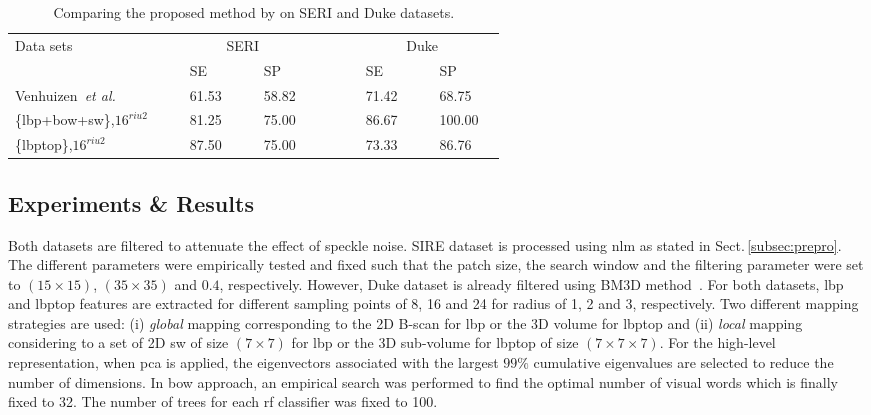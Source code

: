 \begin{tiny}
\begin{table*}[t]
\caption{Comparing the proposed method by \cite{Venhuizen2015} on SERI and Duke datasets.}%
\centering
\begin{tabular}{lcclcclcccclcclc}
\toprule
Data sets 	& & &\multicolumn{4}{c}{SERI}& & & & &\multicolumn{4}{c}{Duke} & \\
  \cmidrule(l){2-8}  \cmidrule(l){10-16}
	         & & & SE & & & SP & & & & & SE & & & SP & \\
\midrule
Venhuizen~\textit{et al.} \cite{Venhuizen2015} 		& & & 61.53 & & & 58.82 & & & & & 71.42 & & & 68.75 & \\
\{\ac{lbp}+\ac{bow}+\ac{sw}\},$16^{riu2}$ 	& & & 81.25 & & & 75.00 & & & & & 86.67 & & & 100.00 &  \\
\{\ac{lbptop}\},$16^{riu2}$				& & & 87.50 & & & 75.00 & & & & & 73.33 & & & 86.76 &  \\


\bottomrule
\end{tabular}
\label{tab:ComparisonRefandOurs}
\end{table*}

\end{tiny}

\subsection{Experiments \& Results}

Both datasets are filtered to attenuate the effect of speckle noise.
SIRE dataset is processed using \ac{nlm} as stated in Sect.\,\ref{subsec:prepro}.
The different parameters were empirically tested and fixed such that the patch size, the search window and the filtering parameter were set to $(15 \times 15)$, $(35 \times 35)$ and $0.4$, respectively.
However, Duke dataset is already filtered using BM3D method~\cite{Srinivasan2014}.
For both datasets, \ac{lbp} and \ac{lbptop} features are extracted for different sampling points of 8, 16 and 24 for radius of 1, 2 and 3, respectively.
Two different mapping strategies are used: (i) \emph{global} mapping corresponding to the 2D B-scan for \ac{lbp} or the 3D volume for \ac{lbptop} and (ii) \emph{local} mapping considering to a set of 2D \ac{sw} of size $(7 \times 7)$ for \ac{lbp} or the 3D sub-volume for \ac{lbptop} of size $(7 \times 7 \times 7)$.
For the high-level representation, when \ac{pca} is applied, the eigenvectors associated with the largest $99\%$ cumulative eigenvalues are selected to reduce the number of dimensions. In \ac{bow} approach, an empirical search was performed to find the optimal number of visual words which is finally fixed to 32.
The number of trees for each \ac{rf} classifier was fixed to 100.

